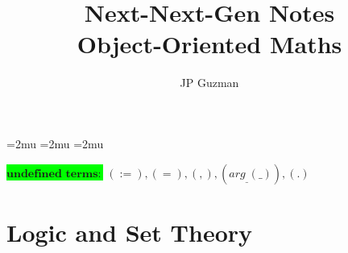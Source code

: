 \documentclass[a4paper]{article}
\title{Next-Next-Gen Notes \\
\large Object-Oriented Maths}
\author{JP Guzman}
\newcommand{\tdb}[1]{\colorbox{lime}{$\displaystyle #1$}}
\newcommand{\defeq}{:=}
\newcommand{\eq}{=}
\newcommand{\cusand}{,}
\newcommand{\cuspop}[2]{arg_{#1}(#2)}
\newcommand{\cusend}{.}
\begin{document}
\maketitle
\allowdisplaybreaks


\thinmuskip=2mu %
\medmuskip=2mu %
\thickmuskip=2mu %
\setlength{\belowdisplayskip}{0pt} \setlength{\belowdisplayshortskip}{0pt}
\setlength{\abovedisplayskip}{0pt} \setlength{\abovedisplayshortskip}{0pt}


\tdb{\textbf{undefined terms}:} $%
   (\defeq), (\eq), (\cusand), (\cuspop{\_}{\_}), (\cusend) %
$

\section{Logic and Set Theory}
\end{document}
